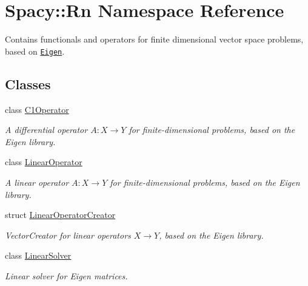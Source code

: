 \hypertarget{namespaceSpacy_1_1Rn}{}\section{Spacy\+:\+:Rn Namespace Reference}
\label{namespaceSpacy_1_1Rn}


Contains functionals and operators for finite dimensional vector space problems, based on \href{http://eigen.tuxfamily.org}{\tt Eigen}.  


\subsection*{Classes}
\begin{DoxyCompactItemize}
\item 
class \hyperlink{classSpacy_1_1Rn_1_1C1Operator}{C1\+Operator}
\begin{DoxyCompactList}\small\item\em A differential operator $A:X\rightarrow Y$ for finite-\/dimensional problems, based on the Eigen library. \end{DoxyCompactList}\item 
class \hyperlink{classSpacy_1_1Rn_1_1LinearOperator}{Linear\+Operator}
\begin{DoxyCompactList}\small\item\em A linear operator $A:X\rightarrow Y$ for finite-\/dimensional problems, based on the Eigen library. \end{DoxyCompactList}\item 
struct \hyperlink{structSpacy_1_1Rn_1_1LinearOperatorCreator}{Linear\+Operator\+Creator}
\begin{DoxyCompactList}\small\item\em Vector\+Creator for linear operators $X\rightarrow Y$, based on the Eigen library. \end{DoxyCompactList}\item 
class \hyperlink{classSpacy_1_1Rn_1_1LinearSolver}{Linear\+Solver}
\begin{DoxyCompactList}\small\item\em Linear solver for Eigen matrices. \end{DoxyCompactList}\end{DoxyCompactItemize}
